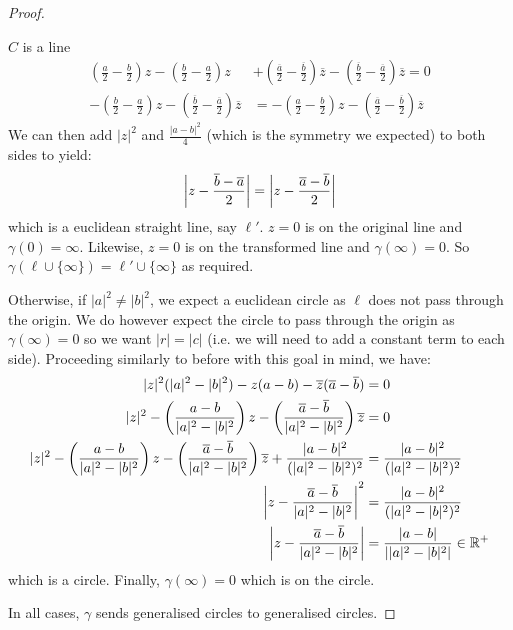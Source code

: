 \documentclass[../main.tex]{subfiles}
\begin{document}
\begin{proof}
\begin{proofcases}
\begin{case}{$C$ is a line}
\begin{align*}
        \left(\frac{a}{2} - \frac{b}{2}\right)z - \left(\frac{b}{2} - \frac{a}{2}\right)z &+ \left(\frac{\overline{a}}{2} - \frac{\overline{b}}{2}\right)\overline{z} - \left(\frac{\overline{b}}{2} - \frac{\overline{a}}{2}\right)\overline{z} = 0 \\
        -\left(\frac{b}{2} - \frac{a}{2}\right)z - \left(\frac{\overline{b}}{2} - \frac{\overline{a}}{2}\right)\overline{z} &= -\left(\frac{a}{2} - \frac{b}{2}\right)z -\left(\frac{\overline{a}}{2} - \frac{\overline{b}}{2}\right)\overline{z}
      \end{align*}
      We can then add $|z|^2$ and $\frac{|a - b|^2}{4}$ (which is the symmetry we expected) to both sides to yield:
      \[
        \left\lvert z - \frac{\overline{b} - \overline{a}}{2} \right\rvert = \left\lvert z - \frac{\overline{a} - \overline{b}}{2} \right\rvert
      \]
      which is a euclidean straight line, say $\ell'$.
      $z = 0$ is on the original line and $\gamma(0) = \infty$.
      Likewise, $z = 0$ is on the transformed line and $\gamma(\infty) = 0$.
      So $\gamma(\ell \cup \{\infty\}) = \ell' \cup \{\infty\}$ as required.

      Otherwise, if $|a|^2 \neq |b|^2$, we expect a euclidean circle as $\ell$ does not pass through the origin.
      We do however expect the circle to pass through the origin as $\gamma(\infty) = 0$ so we want $|r| = |c|$ (i.e. we will need to add a constant term to each side).
      Proceeding similarly to before with this goal in mind, we have:
      \begin{align*}
        |z|^2(|a|^2 - |b|^2) - z(a - b) - \overline{z}(\overline{a} - \overline{b}) &= 0 \\
        |z|^2 - \left(\frac{a - b}{|a|^2 - |b|^2}\right)z - \left(\frac{\overline{a} - \overline{b}}{|a|^2 - |b|^2}\right)\overline{z} &= 0 \\
        |z|^2 - \left(\frac{a - b}{|a|^2 - |b|^2}\right)z - \left(\frac{\overline{a} - \overline{b}}{|a|^2 - |b|^2}\right)\overline{z} + \frac{|a - b|^2}{(|a|^2 - |b|^2)^2} &= \frac{|a - b|^2}{(|a|^2 - |b|^2)^2} \\
        \left\lvert z - \frac{\overline{a} - \overline{b}}{|a|^2 - |b|^2} \right\rvert^2 &= \frac{|a -  b|^2}{(|a|^2 - |b|^2)^2} \\
        \left\lvert z - \frac{\overline{a} - \overline{b}}{|a|^2 - |b|^2} \right\rvert &= \frac{|a -  b|}{\left\lvert |a|^2 - |b|^2 \right\rvert} \in \mathbb{R}^{+}\\
      \end{align*}
      which is a circle.
      Finally, $\gamma(\infty) = 0$ which is on the circle.
    \end{case}
  \end{proofcases}
  In all cases, $\gamma$ sends generalised circles to generalised circles.
\end{proof}
\end{document}
